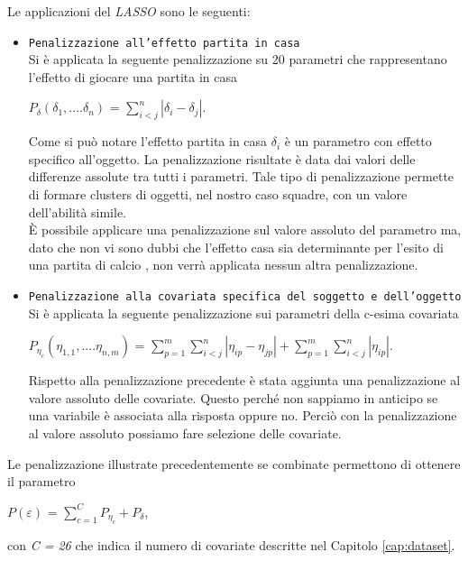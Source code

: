 Le applicazioni del \emph{LASSO} sono le seguenti:
\begin{itemize}
	\item \texttt{Penalizzazione all'effetto partita in casa}\\
	Si è applicata la seguente penalizzazione su 20 parametri che rappresentano l'effetto di giocare una partita in casa
	\begin{center}
		$ P_{\delta}(\delta_1,....\delta_n)$ = $\sum^{n}_{i<j}|\delta_i - \delta_j|$.
	\end{center}
	Come si può notare l'effetto partita in casa $\delta_i$ è un parametro con effetto specifico all'oggetto. La penalizzazione risultate è data dai valori delle differenze assolute tra tutti i parametri. Tale tipo di penalizzazione permette di formare clusters di oggetti, nel nostro caso squadre, con un valore dell'abilità simile.\\
	È possibile applicare una penalizzazione sul valore assoluto del parametro ma, dato che non vi sono dubbi che l'effetto casa sia determinante per l'esito di una partita di calcio \autocite{lago2016home}, non verrà applicata nessun altra penalizzazione.
	\item \texttt{Penalizzazione alla covariata specifica del soggetto e dell'oggetto}\\
	Si è applicata la seguente penalizzazione sui parametri della c-esima covariata 
	\begin{center}
		$ P_{\eta_{c}}(\eta_{1,1},....\eta_{n,m})$ = $\sum^{m}_{p=1}\sum^{n}_{i<j}|\eta_{ip} - \eta_{jp}| + \sum^{m}_{p=1}\sum^{n}_{i<j}|\eta_{ip}|$.
	\end{center}
	Rispetto alla penalizzazione precedente è stata aggiunta una penalizzazione al valore assoluto delle covariate. Questo perché non sappiamo in anticipo se una variabile è associata alla risposta oppure no. Perciò con la penalizzazione al valore assoluto possiamo fare selezione delle covariate.\\
\end{itemize}

Le penalizzazione illustrate precedentemente se combinate permettono di ottenere il parametro 
\begin{center}
	$ P(\varepsilon)$ = $\sum_{c=1}^{C}P_{\eta_c} + P_{\delta}$,
	
\end{center}
con \emph{C = 26} che indica il numero di covariate descritte nel Capitolo \ref{cap:dataset}.



